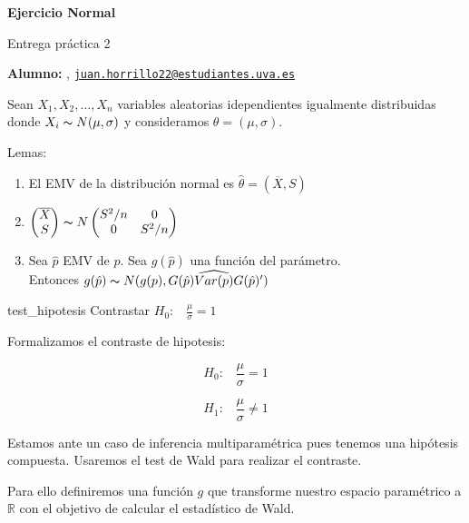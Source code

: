 





\begin{Large}
    \textsf{\textbf{Ejercicio Normal}}

    Entrega práctica 2
\end{Large}

\vspace{1ex}

\textsf{\textbf{Alumno:}} , \href{mailto:juan.horrillo22@estudiantes.uva.es}{\texttt{juan.horrillo22@estudiantes.uva.es}}

\vspace{1ex}

Sean $X_1, X_2, \dots, X_n$ variables aleatorias idependientes igualmente distribuidas donde $X_i \thicksim N(\mu, \sigma)$ y consideramos $\theta = (\mu, \sigma)$.

Lemas:
\begin{enumerate}
    \item El EMV de la distribución normal es $\hat{\theta} = (\overline{X}, S)$
    \item $\begin{pmatrix}\overline{X}\\S\end{pmatrix} \thicksim N\begin{pmatrix}S^2/n & 0\\0 & S^2/n\end{pmatrix}$
    \item Sea $\hat{p}$ EMV de $p$. Sea $g(\hat{p})$ una función del parámetro. \\ Entonces $g(\hat{p}) \thicksim N(g(p), G(\hat{p})\widehat{Var(p)}G(\hat{p})')$
\end{enumerate}

\begin{problem}{}{test_hipotesis}
Contrastar $H_0\text{:}\quad \frac{\mu}{\sigma} = 1$
\end{problem}

Formalizamos el contraste de hipotesis:

\[
    H_0\text{:}\quad \frac{\mu}{\sigma} = 1
\]

\[
    H_1\text{:}\quad \frac{\mu}{\sigma} \neq 1
\]

Estamos ante un caso de inferencia multiparamétrica pues tenemos una hipótesis compuesta. Usaremos el test de Wald para realizar el contraste.

Para ello definiremos una función $g$ que transforme nuestro espacio paramétrico a $\mathbb{R}$ con el objetivo de calcular
el estadístico de Wald.


